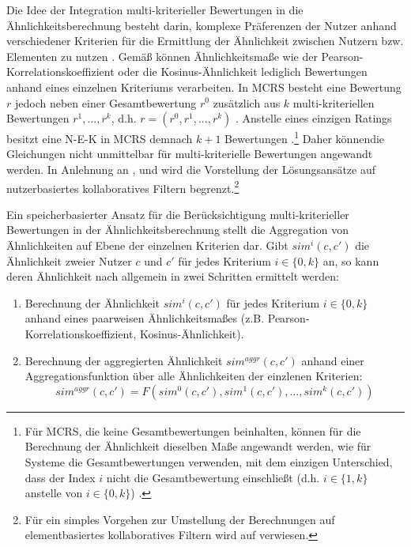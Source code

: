 Die Idee der Integration multi-kriterieller Bewertungen in die Ähnlichkeitsberechnung besteht darin, komplexe Präferenzen der Nutzer anhand verschiedener Kriterien für die Ermittlung der Ähnlichkeit zwischen Nutzern bzw. Elementen zu nutzen \cite[S. 676]{jannach:2:article}. 
Gemäß \textcite[S. 856f.]{adomavicius:4:inbook} können Ähnlichkeitsmaße wie der Pearson-Korrelationskoeffizient oder die Kosinus-Ähnlichkeit lediglich Bewertungen anhand eines einzelnen Kriteriums verarbeiten.
In \ac{MCRS} besteht eine Bewertung $r$ jedoch neben einer Gesamtbewertung $r^{0}$ zusätzlich aus $k$ multi-kriteriellen Bewertungen $r^{1}, ..., r^{k}$, d.h. $r=(r^{0},r^{1}, ..., r^{k})$ \cite[S. 857]{adomavicius:4:inbook}\cite[S. 426]{recommenderSystems:2016}.
Anstelle eines einzigen Ratings besitzt eine \ac{N-E-K} in \ac{MCRS} demnach $k+1$ Bewertungen \cite[S. 857]{adomavicius:4:inbook}.\footnote{Für \ac{MCRS}, die keine Gesamtbewertungen beinhalten, können für die Berechnung der Ähnlichkeit dieselben Maße angewandt werden, wie für Systeme die Gesamtbewertungen verwenden, mit dem einzigen Unterschied, dass der Index $i$ nicht die Gesamtbewertung einschließt (d.h. $i \in \{1,k\}$ anstelle von $i \in \{0,k\}$) \cite[S. 857]{adomavicius:4:inbook}.}
Daher könnendie Gleichungen nicht unmittelbar für multi-kriterielle Bewertungen angewandt werden.
In Anlehnung an \textcite[S. 49]{adomavicius:inproceedings:2}, \textcite[S. 860]{adomavicius:4:inbook} und \textcite[S. 427]{recommenderSystems:2016} wird die Vorstellung der Lösungsansätze auf nutzerbasiertes kollaboratives Filtern begrenzt.\footnote{Für ein simples Vorgehen zur Umstellung der Berechnungen auf elementbasiertes kollaboratives Filtern wird auf \textcite[S. 49]{adomavicius:inproceedings:2} verwiesen.}

Ein speicherbasierter Ansatz für die Berücksichtigung multi-kriterieller Bewertungen in der Ähnlichkeitsberechnung stellt die Aggregation von Ähnlichkeiten auf Ebene der einzelnen Kriterien dar.
Gibt $sim^{i}(c,c')$ die Ähnlichkeit zweier Nutzer $c$ und $c'$ für jedes Kriterium $i \in \{0,k\}$ an, so kann deren Ähnlichkeit nach \textcite[S. 427]{recommenderSystems:2016} allgemein in zwei Schritten ermittelt werden:
\begin{enumerate}
    \item Berechnung der Ähnlichkeit $sim^{i}(c,c')$ für jedes Kriterium $i \in \{0,k\}$ anhand eines paarweisen Ähnlichkeitsmaßes (z.B. Pearson-Korrelations\-koeffizient, Kosinus-Ähnlichkeit).
    \item Berechnung der aggregierten Ähnlichkeit $sim^{aggr}(c,c')$ anhand einer Aggregationsfunktion über alle Ähnlichkeiten der einzlenen Kriterien:
    \begin{equation}
        sim^{aggr}(c,c') = F(sim^{0}(c,c'), sim^{1}(c,c'), ..., sim^{k}(c,c'))
    \end{equation}
\end{enumerate}

